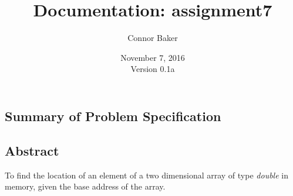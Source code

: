 \documentclass[12pt]{article}
\begin{document}
\null
\nointerlineskip 
\vfill
\let \snewpage \newpage
\let \newpage \relax
    \title{Documentation: assignment7}
    \author{Connor Baker}
    \date{November 7, 2016\\Version 0.1a}
\maketitle
\let \newpage \snewpage
\vfill
\thispagestyle{empty}



\newpage %



\makeatletter
{}
\renewcommand*\l@section{\@dottedtocline{1}{0em}{1.5em}}
\makeatother
\tableofcontents

\clearpage
{}

\begin{center}
\section{Summary of Problem Specification}
\end{center}
\subsection{Abstract}
To find the location of an element of a two dimensional array of type \textit{double} in memory, given the base address of the array.
\end{document}
